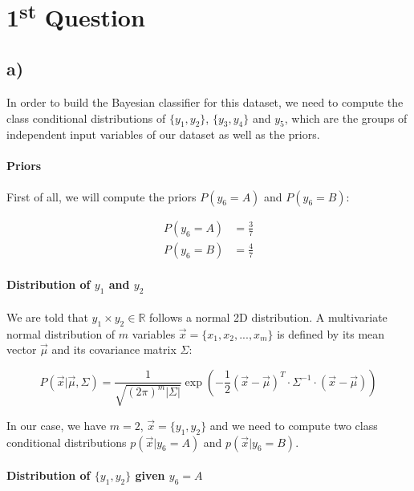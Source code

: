 \documentclass{article}
\begin{document}
\newpage

\section*{1\textsuperscript{st} Question}

\subsection*{a)}

In order to build the Bayesian classifier for this dataset, we need to compute the class conditional distributions of $\{y_1,y_2\}$, $\{y_3,y_4\}$ and $y_5$, which are the groups of independent input variables of our dataset as well as the priors.

\paragraph{Priors}

First of all, we will compute the priors $P(y_6=A)$ and $P(y_6=B)$:

\begin{align*}
  P(y_6=A) &= \frac{3}{7} \\
  P(y_6=B) &= \frac{4}{7} 
\end{align*}


\paragraph{Distribution of $y_1$ and $y_2$}
\paragraph{}

We are told that $y_1 \times y_2 \in \mathbb{R}$ follows a normal 2D distribution.
A multivariate normal distribution of $m$ variables $\vec{x} = \{x_1, x_2, ..., x_m\}$ is defined by its mean vector $\vec{\mu}$ and its covariance matrix $\Sigma$:

\[
  P(\vec{x}| \vec{\mu}, \Sigma) = \frac{1}{\sqrt{(2\pi)^m |\Sigma|}} \exp \left( -\frac{1}{2} (\vec{x} - \vec{\mu})^T \cdot \Sigma^{-1} \cdot (\vec{x} - \vec{\mu}) \right)
  \]

In our case, we have $m = 2$, $\vec{x} = \{y_1, y_2\}$ and we need to compute two class conditional distributions $p(\vec{x}|y_6=A)$ and $p(\vec{x}|y_6=B)$.

\paragraph{Distribution of $\{y_1,y_2\}$ given $y_6=A$}
\end{document}
